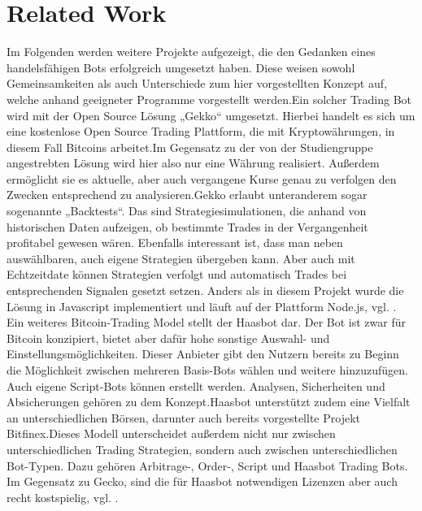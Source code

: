 \section{Related Work}
Im Folgenden werden weitere Projekte aufgezeigt, die den Gedanken eines handelsfähigen Bots
erfolgreich umgesetzt haben. Diese weisen sowohl Gemeinsamkeiten als auch Unterschiede zum hier
vorgestellten Konzept auf, welche anhand geeigneter Programme vorgestellt werden.\newline Ein solcher
Trading Bot wird mit der Open Source Lösung „Gekko“ umgesetzt.
Hierbei handelt es sich um eine kostenlose Open Source Trading Plattform, die mit
Kryptowährungen, in diesem Fall Bitcoins arbeitet.\newline Im Gegensatz zu der von der Studiengruppe
angestrebten Lösung wird hier also nur eine Währung realisiert. Außerdem ermöglicht sie es aktuelle,
aber auch vergangene Kurse genau zu verfolgen den Zwecken entsprechend zu analysieren.\newline Gekko
erlaubt unteranderem sogar sogenannte „Backtests“. Das sind Strategiesimulationen, die anhand von
historischen Daten aufzeigen, ob bestimmte Trades in der Vergangenheit profitabel gewesen wären.
Ebenfalls interessant ist, dass man neben auswählbaren, auch eigene Strategien übergeben kann.\newline
Aber auch mit Echtzeitdate können Strategien verfolgt und automatisch Trades bei entsprechenden
Signalen gesetzt setzen. Anders als in diesem Projekt wurde die Lösung in Javascript implementiert
und läuft auf der Plattform Node.js, vgl. \cite{gekko2}.
\newline Ein weiteres Bitcoin-Trading Model stellt der Haasbot dar. Der Bot ist zwar für Bitcoin konzipiert,
bietet aber dafür hohe sonstige Auswahl- und Einstellungsmöglichkeiten. Dieser Anbieter gibt den
Nutzern bereits zu Beginn die Möglichkeit zwischen mehreren Basis-Bots wählen und weitere
hinzuzufügen. Auch eigene Script-Bots können erstellt werden. Analysen, Sicherheiten und
Absicherungen gehören zu dem Konzept.Haasbot unterstützt zudem eine Vielfalt an
unterschiedlichen Börsen, darunter auch bereits vorgestellte Projekt Bitfinex.\newline Dieses Modell
unterscheidet außerdem nicht nur zwischen unterschiedlichen Trading Strategien, sondern auch
zwischen unterschiedlichen Bot-Typen. Dazu gehören Arbitrage-, Order-, Script und Haasbot Trading
Bots. Im Gegensatz zu Gecko, sind die für Haasbot notwendigen Lizenzen aber auch recht kostspielig, vgl. \cite{haasbot}.\newline
